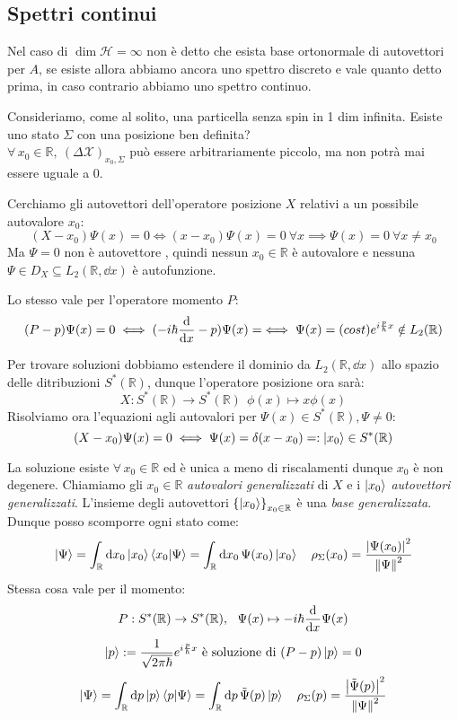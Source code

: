 \subsection{Spettri continui}

Nel caso di \(\dim \mathcal{H}= \infty\) non è detto che esista base ortonormale di autovettori per \(A\),
se esiste allora abbiamo ancora uno spettro discreto e vale quanto detto prima, in caso contrario abbiamo uno spettro continuo.

\begin{example}
    Consideriamo, come al solito, una particella senza spin in 1 dim infinita. Esiste uno stato \(\Sigma\) con una posizione ben definita?\\
    \(\forall\, x_0 \in \mathbb{R}, \ (\Delta \mathcal{X})_{x_0, \Sigma}\) può essere arbitrariamente piccolo, ma non potrà mai essere uguale a \(0\).
\end{example}

Cerchiamo gli autovettori dell'operatore posizione \(X\) relativi a un possibile autovalore \(x_0\):
\[
    (X-x_0)\Psi(x)= 0 \iff (x-x_0)\Psi(x)= 0 \ \forall x \implies \Psi(x) = 0 \ \forall x \neq x_0
\]
Ma \(\Psi= 0\) non è autovettore , quindi nessun \(x_0 \in \mathbb{R}\) è autovalore e nessuna \(\Psi \in D_X\subseteq L_2(\mathbb{R},\dd{x})\) è autofunzione.

Lo stesso vale per l'operatore momento \(P\):
\[
    (P-p)\Psi(x)=0 \iff ( -i\hbar\dv{x} - p ) \Psi(x) = \iff \Psi(x)= (cost)e^{i\frac{p}{\hbar}x} \notin L_2(\mathbb{R})
\]

Per trovare soluzioni dobbiamo estendere il dominio da \(L_2(\mathbb{R},\dd{x})\) allo spazio delle ditribuzioni \(S^*(\mathbb{R})\), 
dunque l'operatore posizione ora sarà: 
\[
    X: S^*(\mathbb{R})\to S^*(\mathbb{R}) \ \ \phi(x)\mapsto x\phi(x)
\]
Risolviamo ora l'equazioni agli autovalori per \(\Psi(x) \in S^*(\mathbb{R}), \Psi\neq 0 \):
\begin{equation}
    (X-x_0)\Psi(x)= 0 \iff \Psi(x)= \delta(x-x_0) = : \ket{x_0} \in S^*(\mathbb{R})
\end{equation}

La soluzione esiste \(\forall\, x_0 \in \mathbb{R}\) ed è unica a meno di riscalamenti dunque \(x_0\) è non degenere.
Chiamiamo gli \(x_0 \in \mathbb{R}\) \textit{autovalori generalizzati} di \(X\) e  i \(\ket{x_0}\)  \textit{autovettori generalizzati}. 
L'insieme degli autovettori \(\left\{ \ket{x_0} \right\}_{x_0 \in \mathbb{R}}\) è una \textit{base generalizzata}. Dunque posso scomporre ogni stato come:
\[
    \ket{\Psi}= \int_{\mathbb{R}}\dd{x_0} \ket{x_0} \braket{x_0}{\Psi} = \int_\mathbb{R} \dd{x_0} \Psi(x_0) \ket{x_0} 
    \quad \rho_\Sigma(x_0) = \frac{\abs{\Psi(x_0)}^2}{\norm{\Psi}^2}
\]
Stessa cosa vale per il momento:
\[
    P: S^*(\mathbb{R})\to S^*(\mathbb{R}),\ \  \Psi(x) \mapsto -i\hbar \dv{x}\Psi(x)
\]
\[
    \ket{p}:= \frac{1}{\sqrt{2\pi \hbar}}e ^{i\frac{p}{\hbar}x} \text{ è soluzione di }  (P-p)\ket{p}=0
\]
\[
    \ket{\Psi} = \int_\mathbb{R} \dd{p} \ket{p} \braket{p}{\Psi}= \int_\mathbb{R} \dd{p} \tilde{\Psi}(p)\ket{p} \quad 
    \rho_\Sigma(p)= \frac{\abs{\tilde{\Psi}(p)}^2}{\norm{\Psi}^2}
\]

